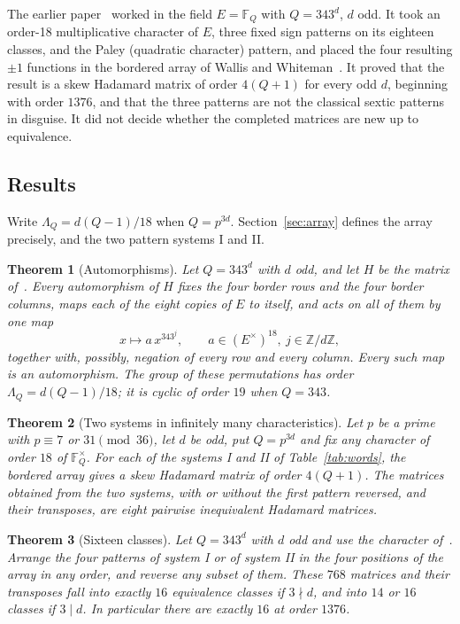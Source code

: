 \documentclass[11pt]{article}
\theoremstyle{plain}
\newtheorem{theorem}{Theorem}[section]
\theoremstyle{definition}
\theoremstyle{remark}
\newcommand{\F}{\mathbb F}
\newcommand{\Z}{\mathbb Z}
\begin{document}
The earlier paper~\cite{Kline18} worked in the field $E=\F_Q$ with
$Q=343^d$, $d$ odd. It took an order-18 multiplicative character of $E$,
three fixed sign patterns on its eighteen classes, and the Paley (quadratic
character) pattern, and placed the four resulting $\pm1$ functions in the
bordered array of Wallis and Whiteman~\cite{WallisWhiteman}. It proved that
the result is a skew Hadamard matrix of order $4(Q+1)$ for every odd $d$,
beginning with order $1376$, and that the three patterns are not the
classical sextic patterns in disguise. It did not decide whether the
completed matrices are new up to equivalence.

\subsection{Results}
Write $\Lambda_Q=d(Q-1)/18$ when $Q=p^{3d}$. Section~\ref{sec:array} defines the
array precisely, and the two pattern systems I and II.

\begin{theorem}[Automorphisms]\label{thm:aut}
Let $Q=343^d$ with $d$ odd, and let $H$ be the matrix of~\cite{Kline18}.
Every automorphism of $H$ fixes the four border rows and the four border
columns, maps each of the eight copies of $E$ to itself, and acts on all of
them by one map
\[
 x\longmapsto a\,x^{343^j},\qquad a\in(E^\times)^{18},\ j\in\Z/d\Z,
\]
together with, possibly, negation of every row and every column. Every such
map is an automorphism. The group of these permutations has order
$\Lambda_Q=d(Q-1)/18$; it is cyclic of order $19$ when $Q=343$.
\end{theorem}

\begin{theorem}[Two systems in infinitely many characteristics]\label{thm:systems}
Let $p$ be a prime with $p\equiv7$ or $31\pmod{36}$, let $d$ be odd, put
$Q=p^{3d}$ and fix any character of order $18$ of $\F_Q^\times$. For each of
the systems I and II of Table~\ref{tab:words}, the bordered array gives a
skew Hadamard matrix of order $4(Q+1)$. The matrices obtained from the two
systems, with or without the first pattern reversed, and their transposes,
are eight pairwise inequivalent Hadamard matrices.
\end{theorem}

\begin{theorem}[Sixteen classes]\label{thm:sixteen}
Let $Q=343^d$ with $d$ odd and use the character of~\cite{Kline18}. Arrange
the four patterns of system I or of system II in the four positions of the
array in any order, and reverse any subset of them. These $768$ matrices and
their transposes fall into exactly $16$ equivalence classes if $3\nmid d$,
and into $14$ or $16$ classes if $3\mid d$. In particular there are exactly
$16$ at order $1376$.
\end{theorem}
\end{document}
